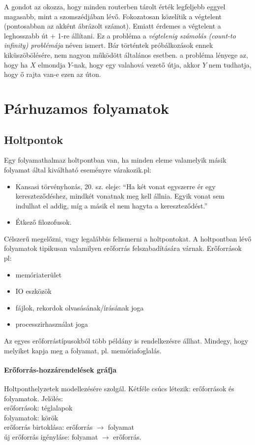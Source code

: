 \documentclass[fleqn,10pt,a4paper]{article}
\theoremstyle{magyar}
\begin{document}
  A gondot az okozza, hogy minden routerben tárolt érték legfeljebb eggyel magasabb, mint a szomszédjában
  lévő. Fokozatosan közelítik a végtelent (pontosabban az akként ábrázolt számot). Emiatt érdemes a végtelent a
  leghosszabb út + 1-re állítani. Ez a probléma a \emph{végtelenig számolás (count-to infinity) problémája} néven
  ismert. Bár történtek próbálkozások ennek kiküszöbölésére, nem nagyon működött általános esetben. a probléma lényege
  az, hogy ha $X$ elmondja $Y$-nak, hogy egy valahová vezető útja, akkor $Y$ nem tudhatja, hogy ő rajta van-e ezen az
  úton.
  
  \newpage
  \setcounter{section}{16}
  \section{Párhuzamos folyamatok}
  
  \subsection{Holtpontok}
  Egy folyamathalmaz holtpontban van, ha minden eleme valamelyik másik folyamat által kiváltható eseményre várakozik.pl:
  \begin{itemize}
  \item Kansasi törvényhozás, 20. sz. eleje: ``Ha két vonat egyszerre ér egy kereszteződéshez, mindkét vonatnak meg
    kell állnia. Egyik vonat sem indulhat el addig, míg a másik el nem hagyta a kereszteződést.''
  \item Étkező filozofusok.
  \end{itemize}
  
  Célszerű megelőzni, vagy legalábbis felismerni a holtpontokat. A holtpontban lévő folyamatok tipikusan valamilyen
  erőforrás felszabadítására várnak. Erőforrások pl:
  \begin{itemize}
  \item memóriaterület
  \item IO eszközök
  \item fájlok, rekordok olvasásának/írásának joga
  \item processzirhasználat joga
  \end{itemize}
  
  Az egyes erőforrástípusokból több példány is rendelkezésre állhat. Mindegy, hogy melyiket kapja meg a folyamat, pl. memóriafoglalás.
  
  \paragraph{Erőforrás-hozzárendelések gráfja} Holtponthelyzetek modellezésére szolgál. Kétféle csúcs létezik:
  erőforrások és folyamatok. Jelölés:\\
  erőforrások: téglalapok\\
  folyamatok: körök\\
  erőforrás birtoklása: erőforrás $\to$ folyamat\\
  új erőforrás igényláse: folyamat $\to$ erőforrás.
  
\end{document}
